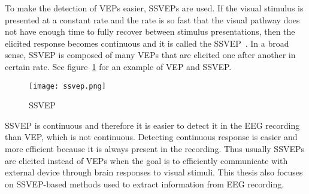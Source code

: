 To make the detection of \glspl{VEP} easier, \glspl{SSVEP} are used. If the visual stimulus is presented at a constant rate and the rate is so fast that the visual pathway does not have enough time to fully recover between stimulus presentations, then the elicited response becomes continuous and it is called the \gls{SSVEP}~\cite{VEP}. In a broad sense, \gls{SSVEP} is composed of many \glspl{VEP} that are elicited one after another in certain rate. See figure~\ref{fig:ssvep} for an example of \gls{VEP} and \gls{SSVEP}.

\begin{figure}[h!]
	\centering
	\texttt{[image: ssvep.png]}
	\caption{SSVEP~\cite[p.~259]{VEP}}
	\label{fig:ssvep}
\end{figure}

\gls{SSVEP} is continuous and therefore it is easier to detect it in the \gls{EEG} recording than \gls{VEP}, which is not continuous. Detecting continuous response is easier and more efficient because it is always present in the recording. Thus usually \glspl{SSVEP} are elicited instead of \glspl{VEP} when the goal is to efficiently communicate with external device through brain responses to visual stimuli. This thesis also focuses on \gls{SSVEP}-based methods used to extract information from \gls{EEG} recording.






